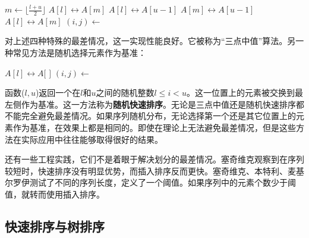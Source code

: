 \documentclass[b5paper]{ctexart}
\begin{document}
\begin{algorithmic}[1]
    \State $m \gets \lfloor \frac{l + u}{2} \rfloor$ 
     
      \State {} $A[l] \leftrightarrow A[m]$
    \EndIf
     
      \State {} $A[l] \leftrightarrow A[u-1]$
    \EndIf
     
      \State {} $A[m] \leftrightarrow A[u-1]$
    \EndIf
    \State {} $A[l] \leftrightarrow A[m]$
    \State $(i, j) \gets $ 
    \State {}
    \State {}
  \EndIf
\EndProcedure
\end{algorithmic}

对上述四种特殊的最差情况，这一实现性能良好。它被称为“三点中值”算法。另一种常见方法是随机选择元素作为基准：

\begin{algorithmic}[1]
    \State {} $A[l] \leftrightarrow A[$  $]$
    \State $(i, j) \gets $ 
    \State {}
    \State {}
  \EndIf
\EndProcedure
\end{algorithmic}

函数($l, u$)返回一个在$l$和$u$之间的随机整数$l \leq i < u$。这一位置上的元素被交换到最左侧作为基准。这一方法称为\textbf{随机快速排序}\cite{CLRS}。无论是三点中值还是随机快速排序都不能完全避免最差情况。如果序列随机分布，无论选择第一个还是其它位置上的元素作为基准，在效果上都是相同的。即使在理论上无法避免最差情况，但是这些方法在实际应用中往往能够取得很好的结果。

还有一些工程实践，它们不是着眼于解决划分的最差情况。塞奇维克观察到在序列较短时，快速排序没有明显优势，而插入排序反而更快\cite{Bentley}\cite{3-way-part}。塞奇维克、本特利、麦基尔罗伊测试了不同的序列长度，定义了一个阈值。如果序列中的元素个数少于阈值，就转而使用插入排序。

\begin{algorithmic}[1]
    \State {}
  \Else
    \State {}
  \EndIf
\EndProcedure
\end{algorithmic}

\subsection{快速排序与树排序}
\end{document}
